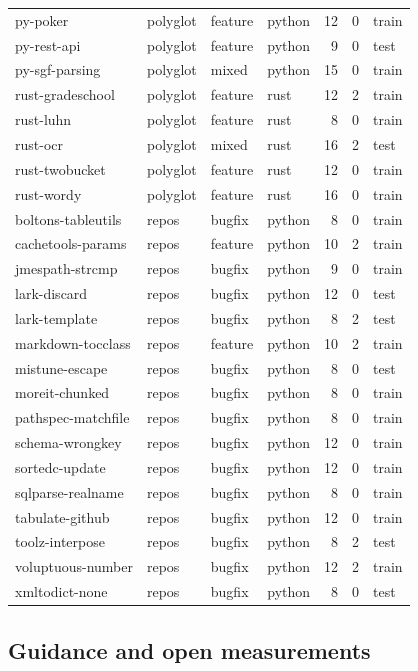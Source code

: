 \documentclass[11pt,letterpaper]{article}
\begin{document}
{\begin{xltabular}{\textwidth}{@{}l l l l r r l@{}}
py-poker & polyglot & feature & python & 12 & 0 & train \\
py-rest-api & polyglot & feature & python & 9 & 0 & test \\
py-sgf-parsing & polyglot & mixed & python & 15 & 0 & train \\
rust-gradeschool & polyglot & feature & rust & 12 & 2 & train \\
rust-luhn & polyglot & feature & rust & 8 & 0 & train \\
rust-ocr & polyglot & mixed & rust & 16 & 2 & test \\
rust-twobucket & polyglot & feature & rust & 12 & 0 & train \\
rust-wordy & polyglot & feature & rust & 16 & 0 & train \\
boltons-tableutils & repos & bugfix & python & 8 & 0 & train \\
cachetools-params & repos & feature & python & 10 & 2 & train \\
jmespath-strcmp & repos & bugfix & python & 9 & 0 & train \\
lark-discard & repos & bugfix & python & 12 & 0 & test \\
lark-template & repos & bugfix & python & 8 & 2 & test \\
markdown-tocclass & repos & feature & python & 10 & 2 & train \\
mistune-escape & repos & bugfix & python & 8 & 0 & test \\
moreit-chunked & repos & bugfix & python & 8 & 0 & train \\
pathspec-matchfile & repos & bugfix & python & 8 & 0 & train \\
schema-wrongkey & repos & bugfix & python & 12 & 0 & train \\
sortedc-update & repos & bugfix & python & 12 & 0 & train \\
sqlparse-realname & repos & bugfix & python & 8 & 0 & train \\
tabulate-github & repos & bugfix & python & 12 & 0 & train \\
toolz-interpose & repos & bugfix & python & 8 & 2 & test \\
voluptuous-number & repos & bugfix & python & 12 & 2 & train \\
xmltodict-none & repos & bugfix & python & 8 & 0 & test \\
\end{xltabular}
}
\FloatBarrier
\subsection{Guidance and open measurements}\label{sec:cguidance}
\end{document}
